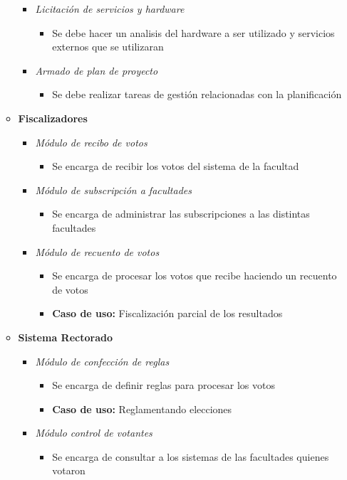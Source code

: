 \begin{itemize}
\begin{itemize}
\begin{itemize}
 \item \emph{Licitación de servicios y hardware}
\begin{itemize}
 \item Se debe hacer un analisis del hardware a ser utilizado y servicios externos que se utilizaran
\end{itemize}
 \item \emph{Armado de plan de proyecto}
\begin{itemize}
 \item Se debe realizar tareas de gestión relacionadas con la planificación
\end{itemize}
\end{itemize}
 \item {\bf Fiscalizadores}
\begin{itemize}
 \item \emph{M\'odulo de recibo de votos}
\begin{itemize}
 \item Se encarga de recibir los votos del sistema de la facultad
\end{itemize}
 \item \emph{M\'odulo de subscripción a facultades}
\begin{itemize}
 \item Se encarga de administrar las subscripciones a las distintas facultades
\end{itemize}
 \item \emph{M\'odulo de recuento de votos}
\begin{itemize}
 \item Se encarga de procesar los votos que recibe haciendo un recuento de votos
 \item {\bf Caso de uso:} Fiscalización parcial de los resultados
\end{itemize}
\end{itemize}
 \item {\bf Sistema Rectorado}
\begin{itemize}
 \item \emph{M\'odulo de confección de reglas}
\begin{itemize}
 \item Se encarga de definir reglas para procesar los votos
 \item {\bf Caso de uso:} Reglamentando elecciones
\end{itemize}
 \item \emph{M\'odulo control de votantes}
\begin{itemize}
 \item Se encarga de consultar a los sistemas de las facultades quienes votaron

\end{itemize}
\end{itemize}
\end{itemize}
\end{itemize}
